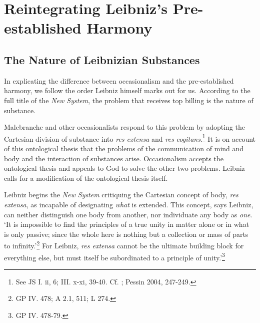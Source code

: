\documentclass{article}
\begin{document}
\section{Reintegrating Leibniz's Pre-established
Harmony}

\subsection{The Nature of Leibnizian
Substances}

In explicating the difference between occasionalism and the
pre-established harmony, we follow the order Leibniz himself marks out
for us. According to the full title of the \emph{New System}, the
problem that receives top billing is the nature of substance.

Malebranche and other occasionalists respond to this problem by adopting
the Cartesian division of substance into \emph{res extensa} and
\emph{res cogitans}.\footnote{See JS I. ii, 6; III. x-xi, 39-40. Cf.
  \autocite{Bardout2000}; Pessin 2004, 247-249.} It is on account of this
ontological thesis that the problems of the communication of mind and
body and the interaction of substances arise. Occasionalism accepts the
ontological thesis and appeals to God to solve the other two problems.
Leibniz calls for a modification of the ontological thesis itself.

Leibniz begins the \emph{New System} critiquing the Cartesian concept of
body, \emph{res extensa}, as incapable of designating \emph{what} is
extended. This concept, says Leibniz, can neither distinguish one body
from another, nor individuate any body as \emph{one}. `It is impossible
to find the principles of a true unity in matter alone or in what is
only passive; since the whole here is nothing but a collection or mass
of parts to infinity.'\footnote{GP IV. 478; A 2.1, 511; L 274.} For
Leibniz, \emph{res extensa} cannot be the ultimate building block for
everything else, but must itself be subordinated to a principle of
unity.'\footnote{GP IV. 478-79.}
\end{document}
